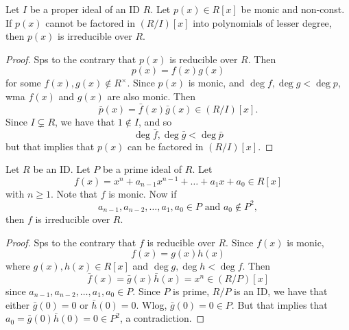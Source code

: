\documentclass[notoc,notitlepage,nobib]{tufte-book}
\begin{document}
\begin{propo}\label{propo:polynomials_that_cannot_be_factored_over_the_ideals_is_irreducible}
  Let $I$ be a proper ideal of an ID $R$. Let $p(x) \in R[x]$ be monic and non-const.
  If $p(x)$ cannot be factored in $\left( R / I \right)[x]$  into polynomials of
  lesser degree, then $p(x)$ is irreducible over $R$.
\end{propo}

\begin{proof}
  Sps to the contrary that $p(x)$ is reducible over $R$. Then
  \begin{equation*}
    p(x) = f(x) g(x)
  \end{equation*}
  for some $f(x), g(x) \notin R^\times$. Since $p(x)$ is monic, and $\deg f, \deg g
  < \deg p$, wma $f(x)$ and $g(x)$ are also monic. Then
  \begin{equation*}
    \bar{p}(x) = \bar{f}(x) \bar{g}(x) \in \left( R/I \right)[x].
  \end{equation*}
  Since $I \subsetneq R$, we have that $1 \notin I$, and so
  \begin{equation*}
    \deg \bar{f}, \deg \bar{g} < \deg \bar{p}
  \end{equation*}
  but that implies that $p(x)$ can be factored in $\left( R/I \right)[x]$.
\end{proof}

\begin{propo}\label{propo:eisenstein_s_criterion}
  Let $R$ be an ID. Let $P$ be a prime ideal of $R$. Let
  \begin{equation*}
    f(x) = x^n + a_{n - 1} x^{n - 1} + \hdots + a_1 x + a_0 \in R[x]
  \end{equation*}
  with $n \geq 1$. Note that $f$ is monic. Now if
  \begin{equation*}
    a_{n - 1}, a_{n - 2}, \ldots, a_1, a_0 \in P \text{ and } a_0 \notin P^2,
  \end{equation*}
  then $f$ is irreducible over $R$.
\end{propo}

\begin{proof}
  Sps to the contrary that $f$ is reducible over $R$. Since $f(x)$ is monic,
  \begin{equation*}
    f(x) = g(x) h(x)
  \end{equation*}
  where $g(x), h(x) \in R[x]$ and $\deg g, \deg h < \deg f$. Then
  \begin{equation*}
    \bar{f}(x) = \bar{g}(x) \bar{h}(x) = x^n \in (R/P)[x]
  \end{equation*}
  since $a_{n - 1}, a_{n - 2}, \ldots, a_1, a_0 \in P$.  Since $P$ is prime,
  $R/P$ is an ID, we have that either $\bar{g}(0) = 0$ or $\bar{h}(0) = 0$.
  Wlog, $\bar{g}(0) = 0 \in P$. But that implies that 
  $a_0 = \bar{g}(0)\bar{h}(0) = 0 \in P^2$, a contradiction.
\end{proof}
\end{document}
